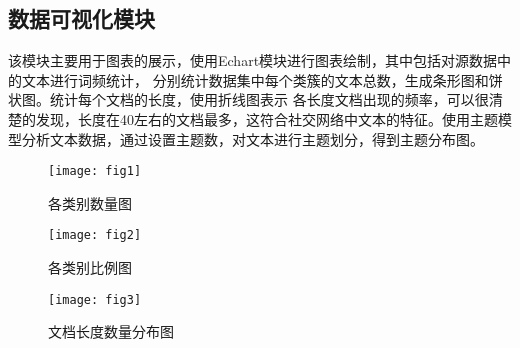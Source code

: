     


    


    

\subsection{数据可视化模块}
该模块主要用于图表的展示，使用Echart模块进行图表绘制，其中包括对源数据中的文本进行词频统计，
分别统计数据集中每个类簇的文本总数，生成条形图和饼状图。统计每个文档的长度，使用折线图表示
各长度文档出现的频率，可以很清楚的发现，长度在40左右的文档最多，这符合社交网络中文本的特征。使用主题模型分析文本数据，通过设置主题数，对文本进行主题划分，得到主题分布图。

\begin{figure}[H]
  \centering
  \texttt{[image: fig1]}
  \caption{各类别数量图}
  \label{fig:upload}
\end{figure}

\begin{figure}[H]
  \centering
  \texttt{[image: fig2]}
  \caption{各类别比例图}
  \label{fig:upload}
\end{figure}

\begin{figure}[H]
  \centering
  \texttt{[image: fig3]}
  \caption{文档长度数量分布图}
  \label{fig:upload}
\end{figure}


